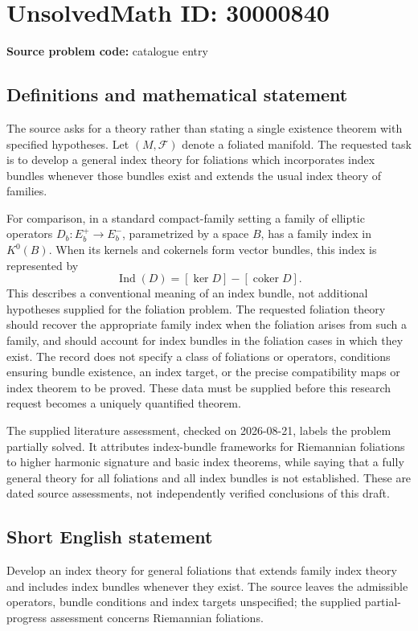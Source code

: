\documentclass[11pt]{article}
\begin{document}
\section*{UnsolvedMath ID: 30000840}
\textbf{Source problem code:} catalogue entry
\subsection{Definitions and mathematical statement}
The source asks for a theory rather than stating a single existence theorem with specified hypotheses. Let $(M,\mathcal F)$ denote a foliated manifold. The requested task is to develop a general index theory for foliations which incorporates index bundles whenever those bundles exist and extends the usual index theory of families.

For comparison, in a standard compact-family setting a family of elliptic operators $D_b:E_b^+\to E_b^-$, parametrized by a space $B$, has a family index in $K^0(B)$. When its kernels and cokernels form vector bundles, this index is represented by
\[
\operatorname{Ind}(D)=[\ker D]-[\operatorname{coker}D].
\]
This describes a conventional meaning of an index bundle, not additional hypotheses supplied for the foliation problem. The requested foliation theory should recover the appropriate family index when the foliation arises from such a family, and should account for index bundles in the foliation cases in which they exist. The record does not specify a class of foliations or operators, conditions ensuring bundle existence, an index target, or the precise compatibility maps or index theorem to be proved. These data must be supplied before this research request becomes a uniquely quantified theorem.

The supplied literature assessment, checked on 2026-08-21, labels the problem partially solved. It attributes index-bundle frameworks for Riemannian foliations to higher harmonic signature and basic index theorems, while saying that a fully general theory for all foliations and all index bundles is not established. These are dated source assessments, not independently verified conclusions of this draft.
\subsection{Short English statement}
Develop an index theory for general foliations that extends family index theory and includes index bundles whenever they exist. The source leaves the admissible operators, bundle conditions and index targets unspecified; the supplied partial-progress assessment concerns Riemannian foliations.
\end{document}
